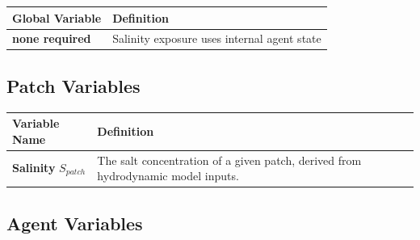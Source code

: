 \documentclass[
]{book}
\begin{document}
\begin{longtable}[]{@{}ll@{}}
\toprule\noalign{}
Global Variable & Definition \\
\midrule\noalign{}
\endhead
\bottomrule\noalign{}
\endlastfoot
\textbf{none required} & Salinity exposure uses internal agent state \\
\end{longtable}

\subsection{Patch Variables}\label{patch-variables-2}

\begin{longtable}[]{@{}
  >{\raggedright\arraybackslash}p{}
  >{\raggedright\arraybackslash}p{}@{}}
\toprule\noalign{}
\begin{minipage}[b]{\linewidth}\raggedright
Variable Name
\end{minipage} & \begin{minipage}[b]{\linewidth}\raggedright
Definition
\end{minipage} \\
\midrule\noalign{}
\endhead
\bottomrule\noalign{}
\endlastfoot
\textbf{Salinity} \(S_{patch}\) & The salt concentration of a given patch, derived from hydrodynamic model inputs. \\
\end{longtable}

\subsection{Agent Variables}\label{agent-variables-2}
\end{document}
